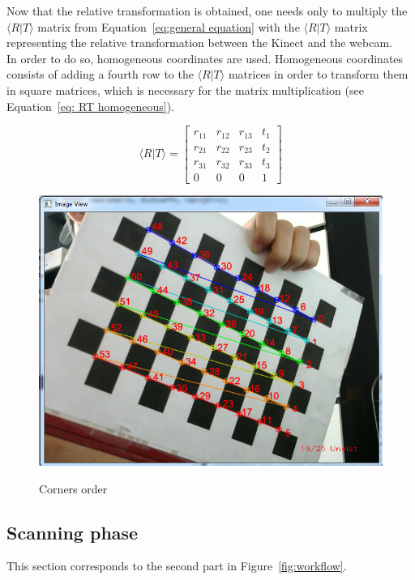 Now that the relative transformation is obtained, one needs only to multiply the $\langle R\vert T\rangle$ matrix from Equation~\ref{eq:general equation} with the $\langle R\vert T\rangle$ matrix representing the relative transformation between the Kinect and the webcam.\\

In order to do so, homogeneous coordinates are used. Homogeneous coordinates consists of adding a fourth row to the $\langle R\vert T\rangle$ matrices in order to transform them in square matrices, which is necessary for the matrix multiplication (see Equation~\ref{eq: RT homogeneous}).

\begin{equation}
\label{eq: RT homogeneous}
  \langle R\vert T\rangle =  \begin{bmatrix}
       r_{11} & r_{12} & r_{13} & t_1 \\
       r_{21} & r_{22} & r_{23} & t_2 \\
       r_{31} & r_{32} & r_{33} & t_3 \\
       0 & 0 & 0 & 1
     \end{bmatrix}
\end{equation}

\begin{figure}[H]
\caption{Corners order}
\centering
    \includegraphics[width=1.0\textwidth]{images/cornersOrder.png}
\label{fig:corners order}
\end{figure}

\subsection{Scanning phase} 
\label{sec:Scanning phase}
This section corresponds to the second part in Figure~\ref{fig:workflow}.\\

